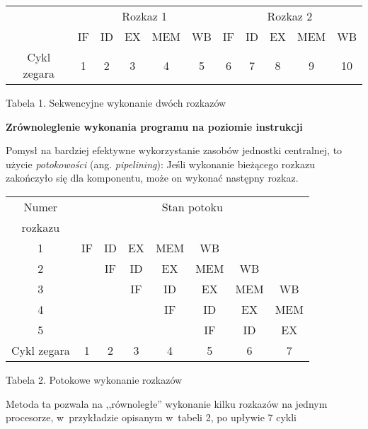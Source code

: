 \documentclass{mwart}
\begin{document}
	\begin{center}
	\begin{tabular}{|c|c|c|c|c|c|c|c|c|c|c|} \hline
	& \multicolumn{5}{c|}{Rozkaz 1} & \multicolumn{5}{c|}{Rozkaz 2}  \\ \cline{2-11}
	& IF & ID & \cellcolor{yellow} EX & MEM & WB & IF & ID & EX & MEM & WB\\ \cline{2-11} \cline{2-11}
	Cykl zegara & 1 & 2 & \cellcolor{yellow} 3 & 4 & 5 & 6 & 7 & 8 & 9 & 10 \\ \hline
	\end{tabular}\par
	\begin{small} Tabela 1. Sekwencyjne wykonanie dwóch rozkazów \end{small} \par
	\end{center}\par
\par
%
\indent
{\bf Zrównoleglenie wykonania programu na poziomie instrukcji}
\par
%
\indent 
	Pomysł na bardziej efektywne wykorzystanie zasobów jednostki centralnej, to użycie \emph{potokowości} (ang. \emph{pipelining}):
	Jeśli wykonanie bieżącego rozkazu zakończyło się dla komponentu, może on wykonać następny rozkaz.
	\begin{center}
	\begin{tabular}{|c|c|c|c|c|c|c|c|} \hline
	Numer 		 & \multicolumn{7}{c|}{Stan potoku} \\
	rozkazu & \multicolumn{7}{c|}{} \\ \hline
	1 & IF & ID & EX & \cellcolor{yellow} MEM & WB & & \\ \hline
	2 & & IF & ID & \cellcolor{yellow} EX & MEM & WB & \\ \hline
	3 & & & IF & \cellcolor{yellow} ID & EX & MEM & WB \\ \hline
	4 & & & & \cellcolor{yellow} IF & ID & EX & MEM \\ \hline
	5 & & & & \cellcolor{yellow} & IF & ID & EX \\ \hline \hline
	Cykl zegara & 1 & 2 & 3 & \cellcolor{yellow} 4 & 5 & 6 & 7 \\ \hline
	\end{tabular}\par
	\begin{small} Tabela 2. Potokowe wykonanie rozkazów \end{small}
	\end{center}
	Metoda ta pozwala na ,,równoległe'' wykonanie kilku rozkazów na jednym procesorze, w~przykładzie opisanym w~tabeli 2, po upływie 7 cykli
\end{document}
